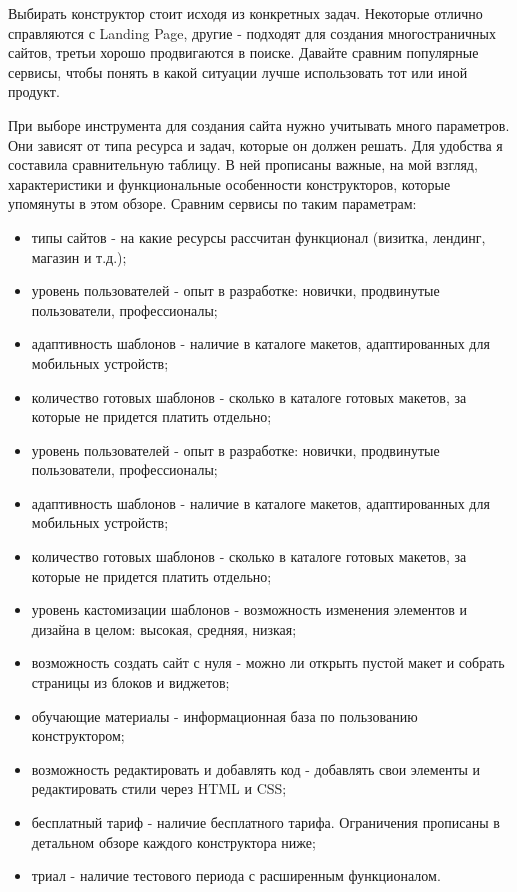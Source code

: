 Выбирать конструктор стоит исходя из конкретных задач. Некоторые отлично справляются с Landing Page, другие - подходят для создания многостраничных сайтов, третьи хорошо продвигаются в поиске. Давайте сравним популярные сервисы, чтобы понять в какой ситуации лучше использовать тот или иной продукт.

При выборе инструмента для создания сайта нужно учитывать много параметров. Они зависят от типа ресурса и задач, которые он должен решать. Для удобства я составила сравнительную таблицу. В ней прописаны важные, на мой взгляд, характеристики и функциональные особенности конструкторов, которые упомянуты в этом обзоре.
Сравним сервисы по таким параметрам:

\begin{itemize}
  \item типы сайтов - на какие ресурсы рассчитан функционал (визитка, лендинг, магазин и т.д.);
  \item уровень пользователей - опыт в разработке: новички, продвинутые пользователи, профессионалы;
  \item адаптивность шаблонов - наличие в каталоге макетов, адаптированных для мобильных устройств;
  \item количество готовых шаблонов - сколько в каталоге готовых макетов, за которые не придется платить отдельно;
  \item уровень пользователей - опыт в разработке: новички, продвинутые пользователи, профессионалы;
  \item адаптивность шаблонов - наличие в каталоге макетов, адаптированных для мобильных устройств;
  \item количество готовых шаблонов - сколько в каталоге готовых макетов, за которые не придется платить отдельно;
  \item уровень кастомизации шаблонов - возможность изменения элементов и дизайна в целом: высокая, средняя, низкая;
  \item возможность создать сайт с нуля - можно ли открыть пустой макет и собрать страницы из блоков и виджетов;
  \item обучающие материалы - информационная база по пользованию конструктором;
  \item возможность редактировать и добавлять код - добавлять свои элементы и редактировать стили через HTML и CSS;
  \item бесплатный тариф - наличие бесплатного тарифа. Ограничения прописаны в детальном обзоре каждого конструктора ниже;
  \item триал - наличие тестового периода с расширенным функционалом.

\end{itemize}
